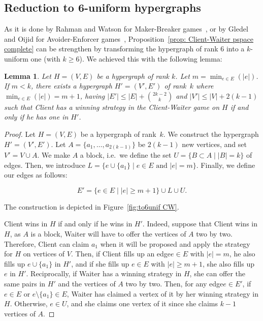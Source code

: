 \documentclass{article}
\newcommand{\hyp}{H}
\newcommand{\WS}{E}
\newcommand{\som}{V}
\newcommand{\hxf}{\hyp = (\som, \WS)}
\newcommand{\hedge}{edge\xspace}
\newcommand{\hedges}{edges\xspace}
\newtheorem{lemma}[theorem]{Lemma}
\begin{document}
\subsection{Reduction to 6-uniform hypergraphs} \label{subsection conclusion}

As it is done by Rahman and Watson for Maker-Breaker games~\cite{RW21}, or by Gledel and Oijid for Avoider-Enforcer games~\cite{GO23}, Proposition~\ref{prop: Client-Waiter pspace complete} can be strengthen by transforming the hypergraph of rank \(6\) into a \(k\)-uniform one (with \(k \ge 6\)). We achieved this with the following lemma:

\begin{lemma}\label{to 6uniform Client-Waiter}
    Let $\hxf$ be a hypergraph of rank $k$. Let $m = \min_{e\in E} (|e|)$. If $m <k$, there exists a hypergraph $\hyp'= (\som',\WS')$ of rank~$k$ where $\min_{e\in E} (|e|) = m+1$, having $|\WS'|\le |\WS| + \binom{2k-2}{k}$ and $|\som'| \le |\som| + 2(k-1)$ such that Client has a winning strategy in the Client-Waiter game on $\hyp$ if and only if he has one in $\hyp'$.
\end{lemma}

\begin{proof}
    Let $\hxf$ be a hypergraph of rank~$k$. We construct the hypergraph $\hyp' = (\som', \WS')$. Let $A = \{a_1, \dots, a_{2(k-1)}\}$ be $2(k-1)$ new vertices, and set $\som' = \som \cup A$. We make $A$ a block, i.e.\ we define the set $ U = \{B \subset A \mid \lvert B\rvert = k \}$ of \hedges. Then, we introduce $L = \{e \cup \{a_1\} \mid e\in \WS \text{ and } \lvert e\rvert = m  \}$. Finally, we define our \hedges as follows:

\[ 
\WS' = \{e\in \WS \mid \lvert e \rvert \ge m+1 \} \cup L \cup U.
\]

The construction is depicted in Figure~\ref{fig:to6unif CW}.

Client wins in $\hyp$ if and only if he wins in $\hyp'$. Indeed, suppose that Client wins in $\hyp$, as $A$ is a block, Waiter will have to offer the vertices of $A$ two by two. Therefore, Client can claim $a_1$ when it will be proposed and apply the strategy for $\hyp$ on vertices of \(V\). Then, if Client fills up an \hedge $e \in \WS$ with $|e| = m$, he also fills up $e \cup \{a_1\}$ in $\hyp'$, and if she fills up \(e \in \WS\) with $|e| \ge m+1$, she also fills up $e$ in $\hyp'$. Reciprocally, if Waiter has a winning strategy in $\hyp$, she can offer the same pairs in $\hyp'$ and the vertices of $A$ two by two. Then, for any \hedge $e \in \WS'$, if $e \in \WS$ or $e \setminus \{a_1\} \in \WS$, Waiter has claimed a vertex of it by her winning strategy in $\hyp$. Otherwise, $e \in U$, and she claims one vertex of it since she claims $k-1$ vertices of $A$.
\end{proof}
\end{document}
